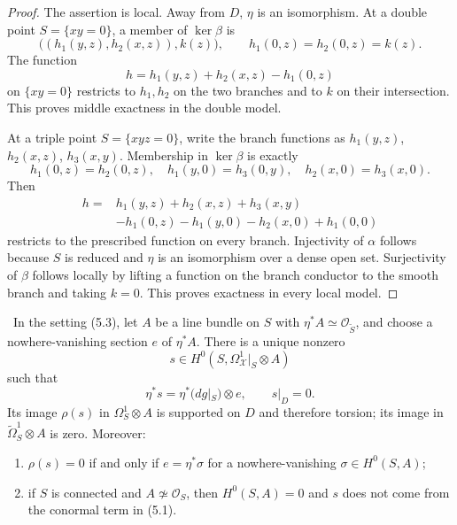 \begin{proof}
The assertion is local.  Away from $D$, $\eta$ is an isomorphism.
At a double point $S=\{xy=0\}$, a member of $\ker\beta$ is
\[
\bigl((h_1(y,z),h_2(x,z)),k(z)\bigr),
\qquad
h_1(0,z)=h_2(0,z)=k(z).
\]
The function
\[
h=h_1(y,z)+h_2(x,z)-h_1(0,z)
\]
on $\{xy=0\}$ restricts to $h_1,h_2$ on the two branches and to $k$ on
their intersection.  This proves middle exactness in the double model.

At a triple point $S=\{xyz=0\}$, write the branch functions as
$h_1(y,z)$, $h_2(x,z)$, $h_3(x,y)$.  Membership in $\ker\beta$ is exactly
\[
h_1(0,z)=h_2(0,z),\quad
h_1(y,0)=h_3(0,y),\quad
h_2(x,0)=h_3(x,0).
\]
Then
\[
\begin{split}
h={}&h_1(y,z)+h_2(x,z)+h_3(x,y)\\
&-h_1(0,z)-h_1(y,0)-h_2(x,0)+h_1(0,0)
\end{split}
\]
restricts to the prescribed function on every branch.  Injectivity of
$\alpha$ follows because $S$ is reduced and $\eta$ is an isomorphism over a
dense open set.  Surjectivity of $\beta$ follows locally by lifting a
function on the branch conductor to the smooth branch and taking $k=0$.
This proves exactness in every local model.
\end{proof}

\begin{theorem}
\label{prop:conductor}
\Verified\ In the setting (5.3), let $A$ be a line bundle on $S$ with
$\eta^*A\simeq\mathcal O_{\widetilde S}$, and choose a nowhere-vanishing
section $e$ of $\eta^*A$.  There is a unique nonzero
\[
s\in H^0(S,\Omega^1_{\mathcal X}|_S\otimes A)
\tag{5.6}
\]
such that
\[
\eta^*s=\eta^*(dg|_S)\otimes e,\qquad s|_D=0.
\tag{5.7}
\]
Its image $\rho(s)$ in $\Omega^1_S\otimes A$ is supported on $D$ and
therefore torsion; its image in
$\widetilde\Omega^1_S\otimes A$ is zero.  Moreover:
\begin{enumerate}[label=(\alph*)]
\item $\rho(s)=0$ if and only if $e=\eta^*\sigma$ for a nowhere-vanishing
$\sigma\in H^0(S,A)$;
\item if $S$ is connected and $A\not\simeq\mathcal O_S$, then
$H^0(S,A)=0$ and $s$ does not come from the conormal term in (5.1).
\end{enumerate}
\end{theorem}

